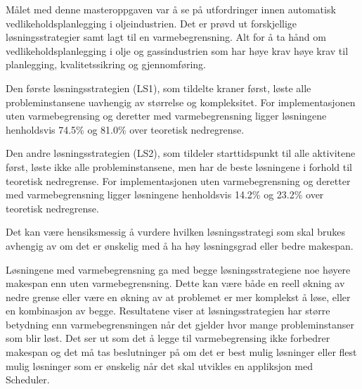 Målet med denne masteroppgaven var å se på utfordringer innen automatisk vedlikeholdsplanlegging i oljeindustrien. Det er prøvd ut forskjellige løsningsstrategier samt lagt til en varmebegrensning. Alt for å ta hånd om vedlikeholdsplanlegging i olje og gassindustrien som har høye krav høye krav til planlegging, kvalitetssikring og gjennomføring.

Den første løsningsstrategien (LS1), som tildelte kraner først, løste alle probleminstansene uavhengig av størrelse og kompleksitet. For implementasjonen uten varmebegrensing og deretter med varmebegrensning ligger løsningene henholdsvis 74.5\% og 81.0\% over teoretisk nedregrense. 

Den andre løsningsstrategien (LS2), som tildeler starttidspunkt til alle aktivitene først, løste ikke alle probleminstansene, men har de beste løsningene i forhold til teoretisk nedregrense. For implementasjonen uten varmebegrensning og deretter med varmebegrensning ligger løsningene henholdsvis 14.2\% og 23.2\% over teoretisk nedregrense.

Det kan være hensiksmessig å vurdere hvilken løsningsstrategi som skal brukes avhengig av om det er ønskelig med å ha høy løsningsgrad eller bedre makespan.

Løsningene med varmebegrensning ga med begge løsningsstrategiene noe høyere makespan enn uten varmebegrensning. Dette kan være både en reell økning av nedre grense eller være en økning av at problemet er mer komplekst å løse, eller en kombinasjon av begge. Resultatene viser at løsningsstrategien har større betydning enn varmebegrensningen når det gjelder hvor mange probleminstanser som blir løst. Det ser ut som det å legge til varmebegrensing ikke forbedrer makespan og det må tas beslutninger på om det er best mulig løsninger eller flest mulig løsninger som er ønskelig når det skal utvikles en appliksjon med Scheduler.